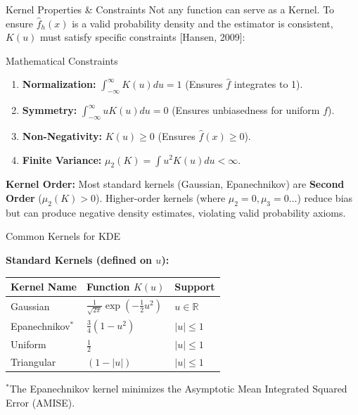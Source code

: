 \documentclass[10pt,aspectratio=169]{ntuabeamer}
\begin{document}
	\begin{frame}{Kernel Properties \& Constraints}
		Not any function can serve as a Kernel. To ensure $\hat{f}_h(x)$ is a valid probability density and the estimator is consistent, $K(u)$ must satisfy specific constraints [Hansen, 2009]:
		
		\begin{block}{Mathematical Constraints}
			\begin{enumerate}
				\item \textbf{Normalization:} $\int_{-\infty}^{\infty} K(u) du = 1$ (Ensures $\hat{f}$ integrates to 1).
				\item \textbf{Symmetry:} $\int_{-\infty}^{\infty} u K(u) du = 0$ (Ensures unbiasedness for uniform $f$).
				\item \textbf{Non-Negativity:} $K(u) \ge 0$ (Ensures $\hat{f}(x) \ge 0$).
				\item \textbf{Finite Variance:} $\mu_2(K) = \int u^2 K(u) du < \infty$.
			\end{enumerate}
		\end{block}
		
		\vspace{0.5em}
		\textbf{Kernel Order:}
		Most standard kernels (Gaussian, Epanechnikov) are \textbf{Second Order} ($\mu_2(K) > 0$). Higher-order kernels (where $\mu_2=0, \mu_3=0 \dots$) reduce bias but can produce negative density estimates, violating valid probability axioms.
	\end{frame}
	
	\begin{frame}{Common Kernels for KDE}
	
		
		\vspace{0.5em}
		
		\textbf{Standard Kernels (defined on $u$):}
		\begin{table}[]
			\centering
			\renewcommand{\arraystretch}{1.5}
			\begin{tabular}{l l l}
				\toprule
				\textbf{Kernel Name} & \textbf{Function} $K(u)$ & \textbf{Support} \\
				\midrule
				Gaussian & $\displaystyle \frac{1}{\sqrt{2\pi}} \exp\left(-\frac{1}{2}u^2\right)$ & $u \in \mathbb{R}$ \\
				Epanechnikov$^*$ & $\displaystyle \frac{3}{4}(1 - u^2)$ & $|u| \le 1$ \\
				Uniform & $\displaystyle \frac{1}{2}$ & $|u| \le 1$ \\
				Triangular & $\displaystyle (1 - |u|)$ & $|u| \le 1$ \\
				\bottomrule
			\end{tabular}
		\end{table}
		
		\footnotesize{$^*$The Epanechnikov kernel minimizes the Asymptotic Mean Integrated Squared Error (AMISE).}
	\end{frame}
	
\end{document}
